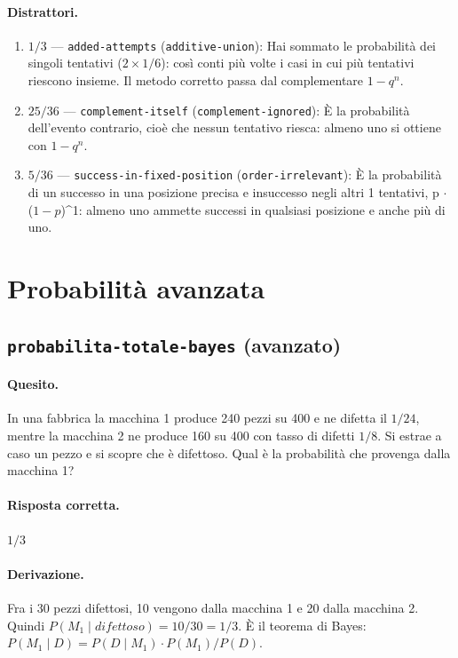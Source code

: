 \paragraph{Distrattori.}
\begin{enumerate}
  \item $1/3$ --- \texttt{added-attempts} (\texttt{additive-union}): Hai sommato le probabilità dei singoli tentativi ($2 \times  1/6$): così conti più volte i casi in cui più tentativi riescono insieme. Il metodo corretto passa dal complementare $1 - q^{n}$.
  \item $25/36$ --- \texttt{complement-itself} (\texttt{complement-ignored}): È la probabilità dell'evento contrario, cioè che nessun tentativo riesca: \guillemotleft{}almeno uno\guillemotright{} si ottiene con $1 - q^{n}$.
  \item $5/36$ --- \texttt{success-in-fixed-position} (\texttt{order-irrelevant}): È la probabilità di un successo in una posizione precisa e insuccesso negli altri 1 tentativi, p $\cdot$ ($1 - p$)\textasciicircum{}1: \guillemotleft{}almeno uno\guillemotright{} ammette successi in qualsiasi posizione e anche più di uno.
\end{enumerate}

\section{Probabilità avanzata}

\subsection{\texorpdfstring{\texttt{probabilita-totale-bayes} (avanzato)}{probabilita-totale-bayes (avanzato)}}

\paragraph{Quesito.} In una fabbrica la macchina 1 produce 240 pezzi su 400 e ne difetta il $1/24$, mentre la macchina 2 ne produce 160 su 400 con tasso di difetti $1/8$. Si estrae a caso un pezzo e si scopre che è difettoso. Qual è la probabilità che provenga dalla macchina 1?

\paragraph{Risposta corretta.} $1/3$

\paragraph{Derivazione.} Fra i 30 pezzi difettosi, 10 vengono dalla macchina 1 e 20 dalla macchina 2. Quindi $P(M_{1}\mid difettoso) = 10/30 = 1/3$. È il teorema di Bayes: $P(M_{1}\mid D) = P(D\mid M_{1})\cdot P(M_{1}) / P(D)$.

